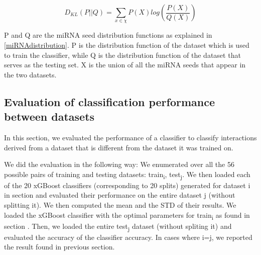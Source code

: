 \documentclass{bmcart}
\begin{document}
\begin{equation}
 D_{KL} \left (P ||Q \right ) = \sum_{x\in \chi }{P\left ( X \right )log\left ( \frac{P\left ( X \right )}{Q\left ( X \right )} \right )}\label{eq:1}
\end{equation}

P and Q are the miRNA seed distribution functions as explained in \ref{miRNAdistribution}. P is the distribution function of the dataset which is used to train the classifier, while Q is the distribution function of the dataset that serves as the testing set. X is the union of all the miRNA seeds that appear in the two datasets.

\subsection*{Evaluation of classification performance between datasets}
In this section, we evaluated the performance of a classifier to classify interactions derived from a dataset that is different from the dataset it was trained on. 


We did the evaluation in the following way: We enumerated over all the 56 possible pairs of training and testing datasets: train\textsubscript{i}, test\textsubscript{j}. We then loaded each of the 20 xGBoost classifiers (corresponding to 20 splits) generated for dataset i in section  and evaluated their performance on the entire dataset j (without splitting it). We then computed the mean and the STD of their results.
We loaded the xGBoost classifier with the optimal parameters for train\textsubscript{i} as found in section . Then, we loaded the entire test\textsubscript{j} dataset (without spliting it) and evaluated the accuracy of the classifier accuracy. In cases where i=j,  we reported the result found in previous section.



\end{document}
